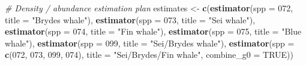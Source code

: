 \documentclass[
]{book}
\newenvironment{Shaded}{\begin{snugshade}}{\end{snugshade}}
\newcommand{\AttributeTok}[1]{\textcolor[rgb]{0.13,0.29,0.53}{#1}}
\newcommand{\CommentTok}[1]{\textcolor[rgb]{0.56,0.35,0.01}{\textit{#1}}}
\newcommand{\ConstantTok}[1]{\textcolor[rgb]{0.56,0.35,0.01}{#1}}
\newcommand{\FunctionTok}[1]{\textcolor[rgb]{0.13,0.29,0.53}{\textbf{#1}}}
\newcommand{\NormalTok}[1]{#1}
\newcommand{\OtherTok}[1]{\textcolor[rgb]{0.56,0.35,0.01}{#1}}
\newcommand{\StringTok}[1]{\textcolor[rgb]{0.31,0.60,0.02}{#1}}
\begin{document}
\begin{Shaded}
\begin{Highlighting}[]
  \CommentTok{\# Density / abundance estimation plan}
\NormalTok{   estimates }\OtherTok{\textless{}{-}}
      \FunctionTok{c}\NormalTok{(}\FunctionTok{estimator}\NormalTok{(}\AttributeTok{spp =} \StringTok{\textquotesingle{}072\textquotesingle{}}\NormalTok{, }\AttributeTok{title =} \StringTok{"Bryde\textquotesingle{}s whale"}\NormalTok{),}
        \FunctionTok{estimator}\NormalTok{(}\AttributeTok{spp =} \StringTok{\textquotesingle{}073\textquotesingle{}}\NormalTok{, }\AttributeTok{title =} \StringTok{"Sei whale"}\NormalTok{),}
        \FunctionTok{estimator}\NormalTok{(}\AttributeTok{spp =} \StringTok{\textquotesingle{}074\textquotesingle{}}\NormalTok{, }\AttributeTok{title =} \StringTok{"Fin whale"}\NormalTok{),}
        \FunctionTok{estimator}\NormalTok{(}\AttributeTok{spp =} \StringTok{\textquotesingle{}075\textquotesingle{}}\NormalTok{, }\AttributeTok{title =} \StringTok{"Blue whale"}\NormalTok{),}
        \FunctionTok{estimator}\NormalTok{(}\AttributeTok{spp =} \StringTok{\textquotesingle{}099\textquotesingle{}}\NormalTok{, }\AttributeTok{title =} \StringTok{"Sei/Bryde\textquotesingle{}s whale"}\NormalTok{),}
        \FunctionTok{estimator}\NormalTok{(}\AttributeTok{spp =} \FunctionTok{c}\NormalTok{(}\StringTok{\textquotesingle{}072\textquotesingle{}}\NormalTok{, }\StringTok{\textquotesingle{}073\textquotesingle{}}\NormalTok{, }\StringTok{\textquotesingle{}099\textquotesingle{}}\NormalTok{, }\StringTok{\textquotesingle{}074\textquotesingle{}}\NormalTok{), }
                  \AttributeTok{title =} \StringTok{"Sei/Bryde\textquotesingle{}s/Fin whale"}\NormalTok{,}
                  \AttributeTok{combine\_g0 =} \ConstantTok{TRUE}\NormalTok{))}
  

\end{Highlighting}
\end{Shaded}
\end{document}
